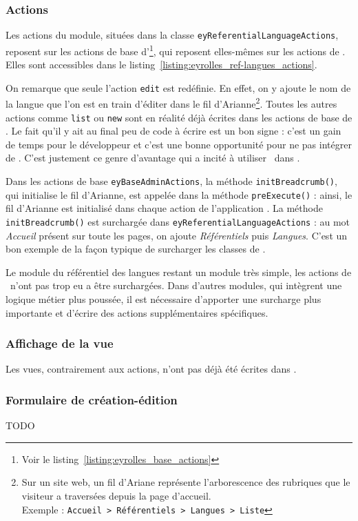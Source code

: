 \subsubsection{Actions}

Les actions du module, situées dans la classe \texttt{ey\-Referential\-Language\-Actions}, reposent sur les actions de base d'\aey\footnote{Voir le listing~\ref{listing:eyrolles_base_actions}}, qui reposent elles-mêmes sur les actions de \asladmin. Elles sont accessibles dans le listing~\ref{listing:eyrolles_ref-langues_actions}.

On remarque que seule l'action \texttt{edit} est redéfinie. En effet, on y ajoute le nom de la langue que l'on est en train d'éditer dans le fil d'Arianne\footnote{Sur un site web, un fil d'Ariane représente l'arborescence des rubriques que le visiteur a traversées depuis la page d'accueil.\cite{breadcrumb}\\Exemple : \texttt{Accueil > Référentiels > Langues > Liste}}. Toutes les autres actions comme \texttt{list} ou \texttt{new} sont en réalité déjà écrites dans les actions de base de \asladmin. Le fait qu'il y ait au final peu de code à écrire est un bon signe : c'est un gain de temps pour le développeur et c'est une bonne opportunité pour ne pas intégrer de \abug. C'est justement ce genre d'avantage qui a incité à utiliser \asladmin\ dans \aey.

Dans les actions de base \texttt{eyBaseAdminActions}, la méthode \texttt{init\-Bread\-crumb()}, qui initialise le fil d'Arianne, est appelée dans la méthode \texttt{pre\-Execute()} : ainsi, le fil d'Arianne est initialisé dans chaque action de l'application \aey. La méthode \texttt{initBreadcrumb()} est surchargée dans \texttt{ey\-Referential\-Language\-Actions} : au mot \textit{Accueil} présent sur toute les pages, on ajoute \textit{Référentiels} puis \textit{Langues}. C'est un bon exemple de la façon typique de surcharger les classes de \asladmin.

Le module du référentiel des langues restant un module très simple, les actions de \asladmin\ n'ont pas trop eu a être surchargées. Dans d'autres modules, qui intègrent une logique métier plus poussée, il est nécessaire d'apporter une surcharge plus importante et d'écrire des actions supplémentaires spécifiques.


\subsubsection{Affichage de la vue}

Les vues, contrairement aux actions, n'ont pas déjà été écrites dans \asladmin.


\subsubsection{Formulaire de création-édition}

TODO
